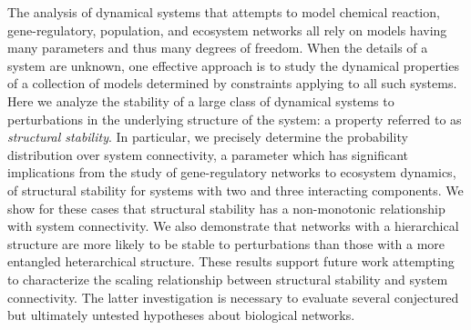 The analysis of dynamical systems that attempts to model chemical reaction, gene-regulatory, population, and ecosystem networks all rely on models having many parameters and thus many degrees of freedom. When the details of a system are unknown, one effective approach is to study the dynamical properties of a collection of models determined by constraints applying to all such systems. Here we analyze the stability of a large class of dynamical systems to perturbations in the underlying structure of the system: a property referred to as \emph{structural stability}. In particular, we precisely determine the probability distribution over system connectivity, a parameter which has significant implications from the study of gene-regulatory networks to ecosystem dynamics, of structural stability for systems with two and three interacting components. We show for these cases that structural stability has a non-monotonic relationship with system connectivity. We also demonstrate that networks with a hierarchical structure are more likely to be stable to perturbations than those with a more entangled heterarchical structure. These results support future work attempting to characterize the scaling relationship between structural stability and system connectivity. The latter investigation is necessary to evaluate several conjectured but ultimately untested hypotheses about biological networks.
